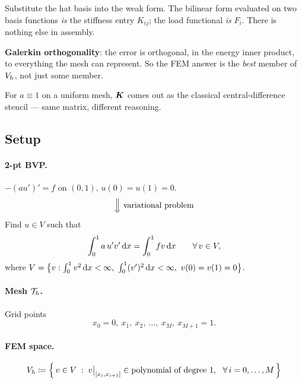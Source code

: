
\begin{roadmap}[Lecture 4]
\begin{roadlist}
\item Substitute the hat basis into the weak form. The bilinear form evaluated
  on two basis functions \emph{is} the stiffness entry $K_{ij}$; the load
  functional \emph{is} $F_i$. There is nothing else in assembly.
\item \textbf{Galerkin orthogonality}: the error is orthogonal, in the energy
  inner product, to everything the mesh can represent. So the FEM answer is the
  \emph{best} member of $V_{h}$, not just some member.
\item For $a\equiv1$ on a uniform mesh, $\bm{K}$ comes out as the classical
  central-difference stencil --- same matrix, different reasoning.
\end{roadlist}
\end{roadmap}

\subsection*{Setup}

\paragraph{2-pt BVP.} $-(au')'=f$ on $(0,1)$, $u(0)=u(1)=0$.
\[
  \Big\Downarrow\ \text{variational problem}
\]
Find $u\in V$ such that
\begin{equation}\label{eq:var4}
  \int_{0}^{1} a\,u'v'\,\mathrm{d} x=\int_{0}^{1} f v\,\mathrm{d} x \qquad\forall\,v\in V,
\end{equation}
where $V=\bigl\{v:\int_{0}^{1}v^{2}\dx<\infty,\ \int_{0}^{1}(v')^{2}\dx<\infty,\ v(0)=v(1)=0\bigr\}$.

\paragraph{Mesh $\mathcal{T}_{h}$.} Grid points
\[
  x_{0}=0,\ x_{1},\ x_{2},\ \dots,\ x_{M},\ x_{M+1}=1 .
\]

\paragraph{FEM space.}
\begin{equation}\label{eq:Vh4}
  V_{h} \coloneqq \Bigl\{\, v\in V \;:\; v\big|_{[x_{i},x_{i+1}]}
  \in \text{polynomial of degree }1,\ \ \forall\, i=0,\dots,M \,\Bigr\}
\end{equation}

